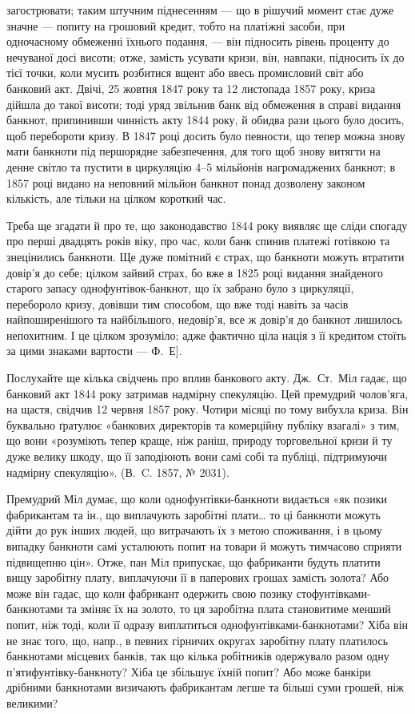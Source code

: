 \parcont{}  %
загострювати; таким штучним піднесенням — що в рішучий момент стає дуже
значне — попиту на грошовий кредит, тобто на платіжні засоби, при одночасному
обмеженні їхнього подання, — він підносить рівень проценту до нечуваної досі
висоти; отже, замість усувати кризи, він, навпаки, підносить їх до тієї точки,
коли мусить розбитися вщент або ввесь промисловий світ або банковий акт.
Двічі, 25 жовтня 1847 року та 12 листопада 1857 року, криза дійшла до такої
висоти; тоді уряд звільнив банк від обмеження в справі видання банкнот, припинивши
чинність акту 1844 року, й обидва рази цього було досить, щоб перебороти
кризу. В 1847 році досить було певности, що тепер можна знову мати
банкноти під першорядне забезпечення, для того щоб знову витягти на денне
світло та пустити в циркуляцію 4--5 мільйонів нагромаджених банкнот; в
1857 році видано на неповний мільйон банкнот понад дозволену законом кількість,
але тільки на цілком короткий час.

Треба ще згадати й про те, що законодавство 1844 року виявляє ще сліди
спогаду про перші двадцять років віку, про час, коли банк спинив платежі готівкою
та знецінились банкноти. Ще дуже помітний є страх, що банкноти можуть
втратити довір’я до себе; цілком зайвий страх, бо вже в 1825 році видання
знайденого старого запасу однофунтівок-банкнот, що їх забрано було з
циркуляції, перебороло кризу, довівши тим способом, що вже тоді навіть за часів
найпоширенішого та найбільшого, недовір’я, все ж довір’я до банкнот лишилось
непохитним. І це цілком зрозуміло; адже фактично ціла нація з її кредитом
стоїть за цими знаками вартости — Ф.~Е].

Послухайте ще кілька свідчень про вплив банкового акту. Дж.~Ст.~Міл
гадає, що банковий акт 1844 року затримав надмірну спекуляцію. Цей премудрий
чолов’яга, на щастя, свідчив 12 червня 1857 року. Чотири місяці по тому
вибухла криза. Він буквально ґратулює «банкових директорів та комерційну
публіку взагалі» з тим, що вони «розуміють тепер краще, ніж раніш, природу
торговельної кризи й ту дуже велику шкоду, що її заподіюють вони самі собі
та публіці, підтримуючи надмірну спекуляцію». (В.~C. 1857, № 2031).

Премудрий Міл думає, що коли однофунтівки-банкноти видається «як позики
фабрикантам та ін., що виплачують заробітні плати\dots{} то ці банкноти
можуть дійти до рук інших людей, що витрачають їх з метою споживання, і в
цьому випадку банкноти самі усталюють попит на товари й можуть тимчасово
сприяти підвищепню цін». Отже, пан Міл припускає, що фабриканти будуть
платити вищу заробітну плату, виплачуючи її в паперових грошах замість золота?
Або може він гадає, що коли фабрикант одержить свою позику стофунтівками-банкнотами
та зміняє їх на золото, то ця заробітна плата становитиме менший
попит, ніж тоді, коли її одразу виплатиться однофунтівками-банкнотами? Хіба
він не знає того, що, напр., в певних гірничих округах заробітну плату платилось
банкнотами місцевих банків, так що кілька робітників одержувало разом
одну п’ятифунтівку-банкноту? Хіба це збільшує їхній попит? Або може банкіри
дрібними банкнотами визичають фабрикантам легше та більші суми грошей,
ніж великими?

